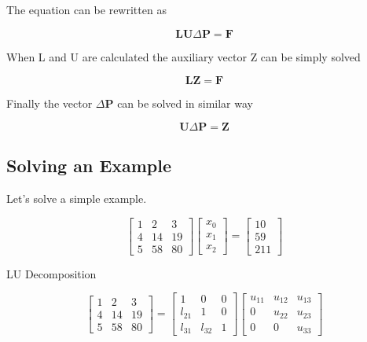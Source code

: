 The equation can be rewritten as

\begin{equation}
\mathbf{LU} \Delta \mathbf{P} = \mathbf{F}
\end{equation}

When L and U are calculated the auxiliary vector Z can be simply solved

\begin{equation}
\mathbf{LZ} = \mathbf{F}
\end{equation}

Finally the vector $\Delta \mathbf{P}$ can be solved in similar way

\begin{equation}
\mathbf{U} \Delta \mathbf{P} = \mathbf{Z}
\end{equation}

\subsection{Solving an Example}

Let's solve a simple example.

\begin{equation}
\begin{bmatrix}
	1 & 2 & 3 \\
	4 & 14 & 19 \\
	5 & 58 & 80
\end{bmatrix}
\begin{bmatrix}
	x_0 \\
	x_1 \\
	x_2
\end{bmatrix}
=
\begin{bmatrix}
	10 \\
	59 \\
	211
\end{bmatrix}
\end{equation}

LU Decomposition

\begin{equation}
\begin{bmatrix}
	1 & 2 & 3 \\
	4 & 14 & 19 \\
	5 & 58 & 80
\end{bmatrix}
=
\begin{bmatrix}
	1 & 0 & 0 \\
	l_{21} & 1 & 0 \\
	l_{31} & l_{32} & 1
\end{bmatrix}
\begin{bmatrix}
	u_{11} & u_{12} & u_{13} \\
	0 & u_{22} & u_{23} \\
	0 & 0 & u_{33}
\end{bmatrix}
\end{equation}

